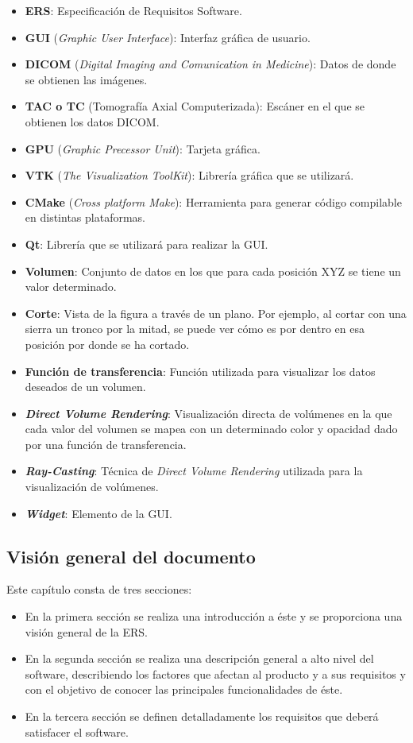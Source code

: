 	\begin{itemize}
		\item \textbf{ERS}: Especificación de Requisitos Software.
		\item \textbf{GUI} (\textit{Graphic User Interface}): Interfaz gráfica de usuario.
		\item \textbf{DICOM} (\textit{Digital Imaging and Comunication in Medicine}): Datos de donde se obtienen las imágenes.
		\item \textbf{TAC o TC} (Tomografía Axial Computerizada): Escáner en el que se obtienen los datos DICOM.
		\item \textbf{GPU} (\textit{Graphic Precessor Unit}): Tarjeta gráfica.
		\item \textbf{VTK} (\textit{The Visualization ToolKit}): Librería gráfica que se utilizará.
		\item \textbf{CMake} (\textit{Cross platform Make}): Herramienta para generar código compilable en distintas plataformas.
		\item \textbf{Qt}: Librería que se utilizará para realizar la GUI.
		\item \textbf{Volumen}: Conjunto de datos en los que para cada posición XYZ se tiene un valor determinado.
		\item \textbf{Corte}: Vista de la figura a través de un plano. Por ejemplo, al cortar con una sierra un tronco por la mitad, se puede ver cómo es por dentro en esa posición por donde se ha cortado.
		\item \textbf{Función de transferencia}: Función utilizada para visualizar los datos deseados de un volumen.
		\item \textbf{\textit{Direct Volume Rendering}}: Visualización directa de volúmenes en la que cada valor del volumen se mapea con un determinado color y opacidad dado por una función de transferencia.
		\item \textbf{\textit{Ray-Casting}}: Técnica de \textit{Direct Volume Rendering} utilizada para la visualización de volúmenes.
		\item \textbf{\textit{Widget}}: Elemento de la GUI.
	\end{itemize}
	
	\subsection{Visión general del documento}
	
	Este capítulo consta de tres secciones:
	\begin{itemize}
		\item En la primera sección se realiza una introducción a éste y se proporciona una visión general de la ERS.
		\item En la segunda sección se realiza una descripción general a alto nivel del software, describiendo los factores que afectan al producto y a sus requisitos y con el objetivo de conocer las principales funcionalidades de éste.
		\item En la tercera sección se definen detalladamente los requisitos que deberá satisfacer el software.
	\end{itemize}

